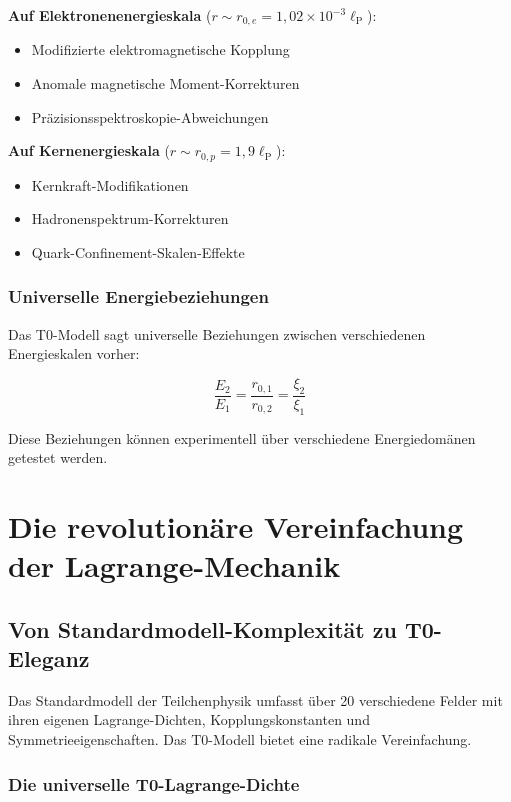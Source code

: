 \documentclass[12pt,a4paper]{report}
\newcommand{\lP}{\ell_{\text{P}}}         %
\begin{document}
	\textbf{Auf Elektronenenergieskala} ($r \sim r_{0,e} = 1,02 \times 10^{-3} \lP$):
	\begin{itemize}
		\item Modifizierte elektromagnetische Kopplung
		\item Anomale magnetische Moment-Korrekturen
		\item Präzisionsspektroskopie-Abweichungen
	\end{itemize}
	
	\textbf{Auf Kernenergieskala} ($r \sim r_{0,p} = 1,9 \lP$):
	\begin{itemize}
		\item Kernkraft-Modifikationen
		\item Hadronenspektrum-Korrekturen
		\item Quark-Confinement-Skalen-Effekte
	\end{itemize}
	
	\subsection{Universelle Energiebeziehungen}\label{subsec:universal_energy_relationships}
	
	Das T0-Modell sagt universelle Beziehungen zwischen verschiedenen Energieskalen vorher:
	
	\begin{equation}
		\frac{E_2}{E_1} = \frac{r_{0,1}}{r_{0,2}} = \frac{\xi_{2}}{\xi_{1}}
		\label{eq:universal_energy_ratios}
	\end{equation}
	
	Diese Beziehungen können experimentell über verschiedene Energiedomänen getestet werden.
	
	\chapter{Die revolutionäre Vereinfachung der Lagrange-Mechanik}
	\label{chap:lagrange}
	
	\section{Von Standardmodell-Komplexität zu T0-Eleganz}
	
	Das Standardmodell der Teilchenphysik umfasst über 20 verschiedene Felder mit ihren eigenen Lagrange-Dichten, Kopplungskonstanten und Symmetrieeigenschaften. Das T0-Modell bietet eine radikale Vereinfachung.
	
	\subsection{Die universelle T0-Lagrange-Dichte}
	
\end{document}
